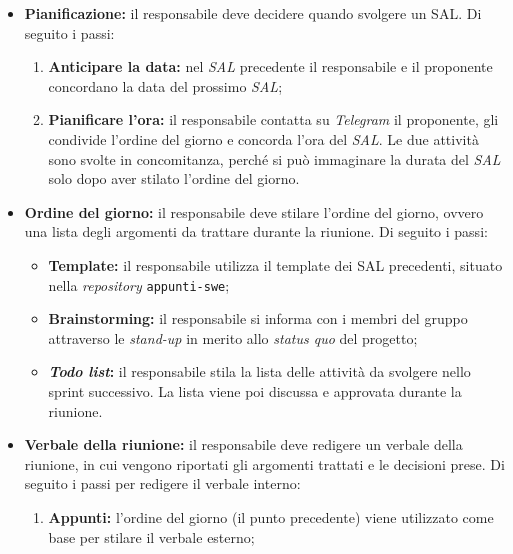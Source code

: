 \begin{itemize}

	\item \textbf{Pianificazione:} il responsabile deve decidere quando svolgere
	      un SAL. Di seguito i passi:
	      \begin{enumerate}
		      \item \textbf{Anticipare la data:} nel \textit{SAL}
		            precedente il responsabile e il proponente concordano
		            la data del prossimo \textit{SAL};

		      \item \textbf{Pianificare l'ora:} il responsabile contatta su
		            \textit{Telegram} il proponente, gli condivide l'ordine del
		            giorno e concorda l'ora del \textit{SAL}. Le due attività
		            sono svolte in concomitanza, perché si può immaginare la
		            durata del \textit{SAL} solo dopo aver stilato l'ordine del
		            giorno.
	      \end{enumerate}

	\item \textbf{Ordine del giorno:} il responsabile deve stilare l'ordine del
	      giorno, ovvero una lista degli argomenti da trattare durante la
	      riunione. Di seguito i passi:
	      \begin{itemize}
		      \item \textbf{Template:} il responsabile utilizza il template
		            dei SAL precedenti, situato nella \textit{repository}
		            \texttt{appunti-swe};

		      \item \textbf{Brainstorming:} il responsabile si informa con i
		            membri del gruppo attraverso le \textit{stand-up} in merito
		            allo \textit{status quo} del progetto;

		      \item \textbf{\textit{Todo list}:} il responsabile stila la lista
		            delle attività da svolgere nello sprint successivo. La
		            lista viene poi discussa e approvata durante la riunione.
	      \end{itemize}

	\item \textbf{Verbale della riunione:} il responsabile deve redigere un
	      verbale della riunione, in cui vengono riportati gli argomenti
	      trattati e le decisioni prese. Di seguito i passi per redigere il
	      verbale interno:
	      \begin{enumerate}
		      \item \textbf{Appunti:} l'ordine del giorno (il punto precedente)
		            viene utilizzato come base per stilare il verbale esterno;


\end{enumerate}
\end{itemize}

